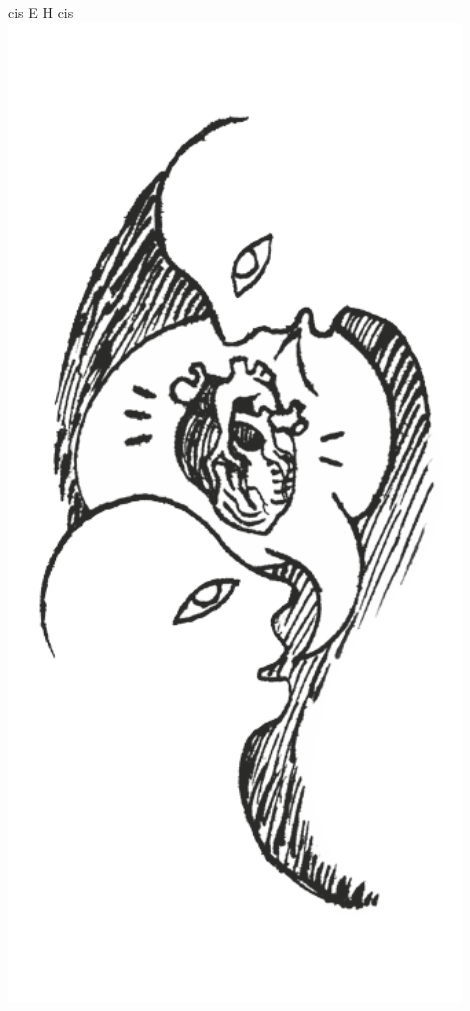 \documentclass[a5paper, 10pt]{book}
\begin{document}
\begin{minipage}[t]{0.2\textwidth}
  cis E H cis\\
  \includegraphics[width=0.9\textwidth]{images/lubie_mowic_z_toba.png}\\

\end{minipage}
\end{document}
